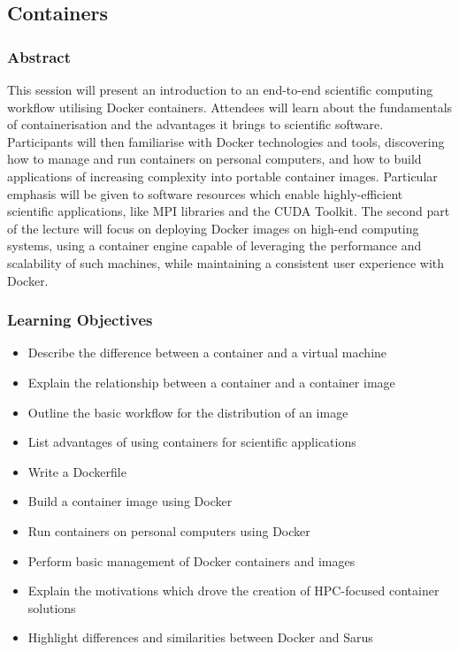 \subsection{Containers}

\subsubsection{Abstract}

This session will present an introduction to an end-to-end scientific computing workflow utilising Docker containers. Attendees will learn about the fundamentals of containerisation and the advantages it brings to scientific software. Participants will then familiarise with Docker technologies and tools, discovering how to manage and run containers on personal computers, and how to build applications of increasing complexity into portable container images. Particular emphasis will be given to software resources which enable highly-efficient scientific applications, like MPI libraries and the CUDA Toolkit. The second part of the lecture will focus on deploying Docker images on high-end computing systems, using a container engine capable of leveraging the performance and scalability of such machines, while maintaining a consistent user experience with Docker.

\subsubsection{Learning Objectives}

\begin{itemize}

\item Describe the difference between a container and a virtual machine
\item Explain the relationship between a container and a container image
\item Outline the basic workflow for the distribution of an image
\item List advantages of using containers for scientific applications
\item Write a Dockerfile
\item Build a container image using Docker
\item Run containers on personal computers using Docker
\item Perform basic management of Docker containers and images
\item Explain the motivations which drove the creation of HPC-focused container solutions
\item Highlight differences and similarities between Docker and Sarus

\end{itemize}


